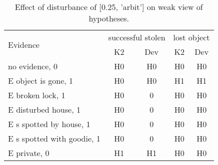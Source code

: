 \begin{table}\begin{tabular}{l|cc|cc}\toprule\multirow{2}{*}{Evidence} & \multicolumn{2}{c}{successful stolen}& \multicolumn{2}{c}{lost object}\\& {K2} & {Dev}& {K2} & {Dev}\\\midrule
no evidence, 0 & H0&H0&H0&H0\\E object is gone, 1 & H0&H0&H1&H1\\E broken lock, 1 & \cellcolor{Bittersweet}H0&\cellcolor{Bittersweet}0&H0&H0\\E disturbed house, 1 & \cellcolor{Bittersweet}H0&\cellcolor{Bittersweet}0&H0&H0\\E s spotted by house, 1 & \cellcolor{Bittersweet}H0&\cellcolor{Bittersweet}0&H0&H0\\E s spotted with goodie, 1 & \cellcolor{Bittersweet}H0&\cellcolor{Bittersweet}0&H0&H0\\E private, 0 & H1&H1&H0&H0\\\bottomrule\end{tabular}\caption{Effect of disturbance of [0.25, 'arbit'] on weak view of hypotheses.}\end{table}
